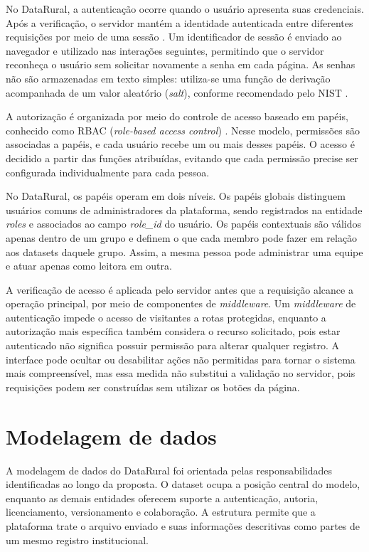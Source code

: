 No DataRural, a autenticação ocorre quando o usuário apresenta suas credenciais. Após a verificação, o servidor mantém a identidade autenticada entre diferentes requisições por meio de uma sessão \cite{nist2025passwords}. Um identificador de sessão é enviado ao navegador e utilizado nas interações seguintes, permitindo que o servidor reconheça o usuário sem solicitar novamente a senha em cada página. As senhas não são armazenadas em texto simples: utiliza-se uma função de derivação acompanhada de um valor aleatório (\textit{salt}), conforme recomendado pelo NIST \cite{nist2025passwords}.

A autorização é organizada por meio do controle de acesso baseado em papéis, conhecido como RBAC (\textit{role-based access control}) \cite{sandhu2000rbac}. Nesse modelo, permissões são associadas a papéis, e cada usuário recebe um ou mais desses papéis. O acesso é decidido a partir das funções atribuídas, evitando que cada permissão precise ser configurada individualmente para cada pessoa.

No DataRural, os papéis operam em dois níveis. Os papéis globais distinguem usuários comuns de administradores da plataforma, sendo registrados na entidade \textit{roles} e associados ao campo \textit{role\_id} do usuário. Os papéis contextuais são válidos apenas dentro de um grupo e definem o que cada membro pode fazer em relação aos datasets daquele grupo. Assim, a mesma pessoa pode administrar uma equipe e atuar apenas como leitora em outra.

A verificação de acesso é aplicada pelo servidor antes que a requisição alcance a operação principal, por meio de componentes de \textit{middleware}. Um \textit{middleware} de autenticação impede o acesso de visitantes a rotas protegidas, enquanto a autorização mais específica também considera o recurso solicitado, pois estar autenticado não significa possuir permissão para alterar qualquer registro. A interface pode ocultar ou desabilitar ações não permitidas para tornar o sistema mais compreensível, mas essa medida não substitui a validação no servidor, pois requisições podem ser construídas sem utilizar os botões da página.

\section{Modelagem de dados}

A modelagem de dados do DataRural foi orientada pelas responsabilidades identificadas ao longo da proposta. O dataset ocupa a posição central do modelo, enquanto as demais entidades oferecem suporte a autenticação, autoria, licenciamento, versionamento e colaboração. A estrutura permite que a plataforma trate o arquivo enviado e suas informações descritivas como partes de um mesmo registro institucional.

